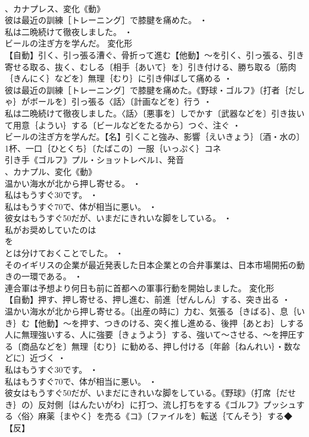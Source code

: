 \documentclass[8pt]{extreport}
\begin{document}
\begin{CJK}{UTF8}{min}
\\	、カナプレス、変化《動》
\\	彼は最近の訓練［トレーニング］で膝腱を痛めた。 ・
\\	私は二晩続けて徹夜しました。 ・
\\	ビールの注ぎ方を学んだ。	変化形 
\\	【自動】引く、引っ張る漕ぐ、骨折って進む【他動】～を引く、引っ張る、引き寄せる取る、抜く、むしる〔相手｛あいて｝を〕引き付ける、勝ち取る〔筋肉｛きんにく｝などを〕無理｛むり｝に引き伸ばして痛める ・
\\	彼は最近の訓練［トレーニング］で膝腱を痛めた。《野球・ゴルフ》〔打者｛だしゃ｝がボールを〕引っ張る〈話〉〔計画などを〕行う ・
\\	私は二晩続けて徹夜しました。〈話〉〔悪事を〕しでかす〔武器などを〕引き抜いて用意｛ようい｝する〔ビールなどをたるから〕つぐ、注ぐ ・
\\	ビールの注ぎ方を学んだ。【名】引くこと強み、影響｛えいきょう｝〔酒・水の〕1杯、一口｛ひとくち｝〔たばこの〕一服｛いっぷく｝コネ
\\	引き手《ゴルフ》プル・ショットレベル1、発音
\\	、カナプル、変化《動》
\\	温かい海水が北から押し寄せる。 ・
\\	私はもうすぐ30です。 ・
\\	私はもうすぐ70で、体が相当に悪い。 ・
\\	彼女はもうすぐ50だが、いまだにきれいな脚をしている。 ・
\\	私がお奨めしていたのは
\\	を
\\	とは分けておくことでした。 ・
\\	そのイギリスの企業が最近発表した日本企業との合弁事業は、日本市場開拓の動きの一環である。 ・
\\	連合軍は予想より何日も前に首都への軍事行動を開始しました。	変化形 
\\	【自動】押す、押し寄せる、押し進む、前進｛ぜんしん｝する、突き出る ・
\\	温かい海水が北から押し寄せる。〔出産の時に〕力む、気張る｛きばる｝、息｛いき｝む【他動】～を押す、つきのける、突く推し進める、後押｛あとお｝しする人に無理強いする、人に強要｛きょうよう｝する、強いて～させる、～を押圧する〔商品などを〕無理｛むり｝に勧める、押し付ける〔年齢｛ねんれい｝・数などに〕近づく ・
\\	私はもうすぐ30です。 ・
\\	私はもうすぐ70で、体が相当に悪い。 ・
\\	彼女はもうすぐ50だが、いまだにきれいな脚をしている。《野球》（打席｛だせき｝の）反対側｛はんたいがわ｝に打つ、流し打ちをする《ゴルフ》プッシュする〈俗〉麻薬｛まやく｝を売る《コ》〔ファイルを〕転送｛てんそう｝する◆【反】

\end{CJK}
\end{document}
